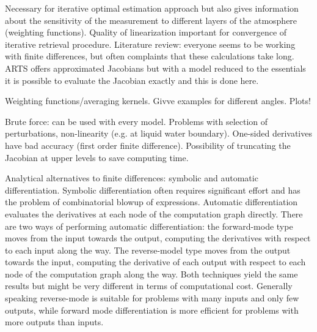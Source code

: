 \stopsection


\startsection[title=Linearization,reference=ch:linearization]

    Necessary for iterative optimal estimation approach but also gives
    information about the sensitivity of the measurement to different layers of
    the atmosphere (weighting functions). Quality of linearization important
    for convergence of iterative retrieval procedure. Literature review:
    everyone seems to be working with finite differences, but often complaints
    that these calculations take long. ARTS offers approximated Jacobians
    but with a model reduced to the essentials it is possible to evaluate the
    Jacobian exactly and this is done here.

    \startsubsection[title=Weighting Functions]

        Weighting functions/averaging kernels. Givve examples for different
        angles. Plots!

    \stopsubsection

    \startsubsection[title=Calculating the Jacobian]

        Brute force: can be used with every model. Problems with selection of
        perturbations, non-linearity (e.g. at liquid water boundary). One-sided
        derivatives have bad accuracy (first order finite difference).
        Possibility of truncating the Jacobian at upper levels to save
        computing time.

        Analytical alternatives to finite differences: symbolic and automatic
        differentiation. Symbolic differentiation often requires significant
        effort and has the problem of combinatorial blowup of expressions.
        Automatic differentiation evaluates the derivatives at each node of
        the computation graph directly. There are two ways of performing
        automatic differentiation: the forward-mode type moves from the input
        towards the output, computing the derivatives with respect to each
        input along the way. The reverse-model type moves from the output
        towards the input, computing the derivative of each output with respect
        to each node of the computation graph along the way. Both techniques
        yield the same results but might be very different in terms of
        computational cost. Generally speaking reverse-mode is suitable for
        problems with many inputs and only few outputs, while forward mode
        differentiation is more efficient for problems with more outputs than
        inputs.

